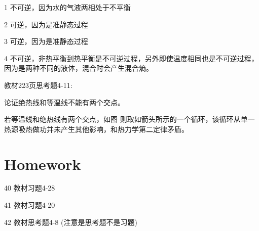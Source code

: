 \documentclass[CJK]{beamer}
\begin{document}
\begin{frame}
  \bch
  \bitem
\item[1]{不可逆，因为水的气液两相处于不平衡}
\item[2]{可逆，因为是准静态过程}
\item[3]{可逆，因为是准静态过程}
\item[4]{不可逆，非热平衡到热平衡是不可逆过程，另外即使温度相同也是不可逆过程，因为是两种不同的液体，混合时会产生混合熵。}
  \eitem
  \ech
\end{frame}


\begin{frame}
\chtitle{\proid (\sone)}
\bch

教材223页思考题4-11:

论证绝热线和等温线不能有两个交点。
\ech
\end{frame}


\begin{frame}
\bch
若等温线和绝热线有两个交点，如图
则取如箭头所示的一个循环，该循环从单一热源吸热做功并未产生其他影响，和热力学第二定律矛盾。

\ech
\end{frame}


\section{Homework}

\begin{frame}
  \bch
  {\small 
    \bitem
\item[40]{教材习题4-28}
\item[41]{教材习题4-20}
\item[42]{教材思考题4-8 (注意是思考题不是习题)}
  \eitem
  }
  \ech
\end{frame}
\end{document}
